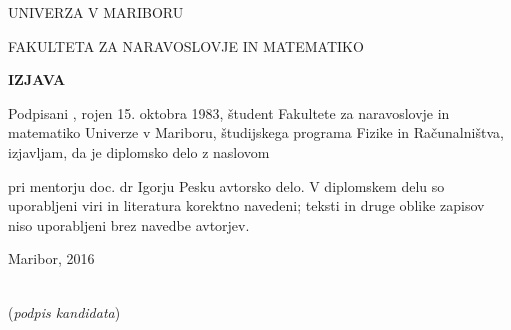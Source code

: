   \newpage

  \begin{center}
    \large
    UNIVERZA V MARIBORU

    FAKULTETA ZA NARAVOSLOVJE IN MATEMATIKO

  \end{center}

  \vspace{2cm}

  \begin{center}
    \Large
    \textbf{IZJAVA}
  \end{center}

  \vspace{2cm}

  Podpisani \kandidat, rojen 15. oktobra 1983, študent
  Fakultete za naravoslovje in matematiko Univerze v Mariboru,
  študijskega programa Fizike in Računalništva, izjavljam, da je
  diplomsko delo z naslovom
  \begin{center}
    \textbf{\podnaslov}
  \end{center}
  pri mentorju doc. dr Igorju Pesku avtorsko delo. V diplomskem delu so
  uporabljeni viri in literatura korektno navedeni; teksti in druge
  oblike zapisov niso uporabljeni brez navedbe avtorjev.

  \vspace{3cm}
  
  Maribor, 2016
  
  \vspace{1cm}  
  \hfill
  \begin{minipage}[t]{0.3\textwidth}
    \kandidat\\
     (\emph{podpis kandidata})
  \end{minipage}
  




